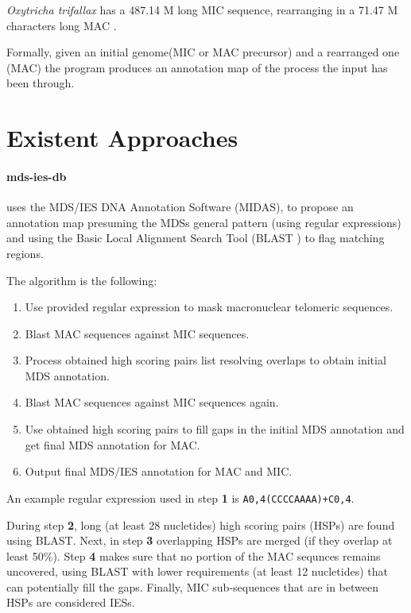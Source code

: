 \textit{Oxytricha trifallax} has a 487.14 M long MIC sequence, rearranging in a 71.47 M characters long MAC \cite{mdsiesdb}.

Formally, given an initial genome(MIC or MAC precursor) and a rearranged one (MAC) the program produces an annotation map of the process the input has been through.

\section{Existent Approaches}

\paragraph{mds-ies-db}\cite{mdsiesdb} uses the MDS/IES DNA Annotation Software (MIDAS), \cite{midas} to propose an annotation map presuming the MDSs general pattern (using regular expressions) and using the Basic Local Alignment Search Tool (BLAST \cite{boratyn2013blast}) to flag matching regions.

The algorithm is the following:

\begin{enumerate}
  \item Use provided regular expression to mask macronuclear telomeric sequences.
  \item Blast MAC sequences against MIC sequences.
  \item Process obtained high scoring pairs list resolving overlaps to obtain initial MDS annotation.
  \item Blast MAC sequences against MIC sequences again.
  \item Use obtained high scoring pairs to fill gaps in the initial MDS annotation and get final MDS annotation for MAC.
  \item Output final MDS/IES annotation for MAC and MIC.
\end{enumerate}

An example regular expression used in step \textbf{1} is \texttt{A{0,4}(CCCCAAAA)+C{0,4}}.

During step \textbf{2}, long (at least 28 nucletides) high scoring pairs (HSPs) are found using BLAST. Next, in step \textbf{3} overlapping HSPs are merged (if they overlap at least 50\%).
Step \textbf{4} makes sure that no portion of the MAC sequnces remains uncovered, using BLAST with lower requirements (at least 12 nucletides) that can potentially fill the gaps.
Finally, MIC sub-sequences that are in between HSPs are considered IESs.

